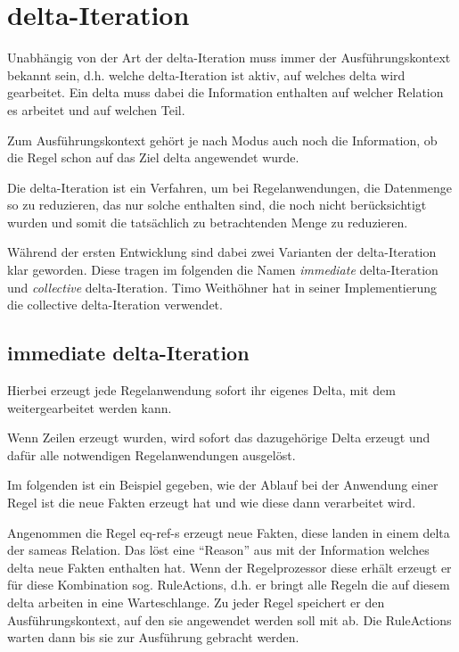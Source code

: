 \section{delta-Iteration}
\label{abschnitt-delta-iteration}

Unabhängig von der Art der delta-Iteration muss immer der Ausführungskontext bekannt sein, d.h. welche delta-Iteration ist aktiv, auf welches delta wird gearbeitet. Ein delta muss dabei die Information enthalten auf welcher Relation es arbeitet und auf welchen Teil.

Zum Ausführungskontext gehört je nach Modus auch noch die Information, ob die Regel schon auf das Ziel delta angewendet wurde.

Die delta-Iteration ist ein Verfahren, um bei Regelanwendungen, die Datenmenge so zu reduzieren, das nur solche enthalten sind, die noch nicht berücksichtigt wurden und somit die tatsächlich zu betrachtenden Menge zu reduzieren.

Während der ersten Entwicklung sind dabei zwei Varianten der delta-Iteration klar geworden. Diese tragen im folgenden die Namen \emph{immediate} delta-Iteration und \emph{collective} delta-Iteration. Timo Weithöhner hat in seiner Implementierung die collective delta-Iteration verwendet.

\subsection{immediate delta-Iteration}

Hierbei erzeugt jede Regelanwendung sofort ihr eigenes Delta, mit dem weitergearbeitet werden kann.

Wenn Zeilen erzeugt wurden, wird sofort das dazugehörige Delta erzeugt und dafür alle notwendigen Regelanwendungen ausgelöst.

Im folgenden ist ein Beispiel gegeben, wie der Ablauf bei der Anwendung einer Regel ist die neue Fakten erzeugt hat und wie diese dann verarbeitet wird.

Angenommen die Regel eq-ref-s erzeugt neue Fakten, diese landen in einem delta der sameas Relation. Das löst eine ``Reason'' aus mit der Information welches delta neue Fakten enthalten hat. Wenn der Regelprozessor diese erhält erzeugt er für diese Kombination sog. RuleActions, d.h. er bringt alle Regeln die auf diesem delta arbeiten in eine Warteschlange. Zu jeder Regel speichert er den Ausführungskontext, auf den sie angewendet werden soll mit ab. Die RuleActions warten dann bis sie zur Ausführung gebracht werden.

